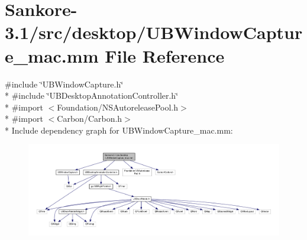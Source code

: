 \hypertarget{_u_b_window_capture__mac_8mm}{\section{Sankore-\/3.1/src/desktop/\-U\-B\-Window\-Capture\-\_\-mac.mm File Reference}
\label{d2/d94/_u_b_window_capture__mac_8mm}
}
{\ttfamily \#include \char`\"{}U\-B\-Window\-Capture.\-h\char`\"{}}\\*
{\ttfamily \#include \char`\"{}U\-B\-Desktop\-Annotation\-Controller.\-h\char`\"{}}\\*
{\ttfamily \#import $<$Foundation/\-N\-S\-Autorelease\-Pool.\-h$>$}\\*
{\ttfamily \#import $<$Carbon/\-Carbon.\-h$>$}\\*
Include dependency graph for U\-B\-Window\-Capture\-\_\-mac.\-mm\-:
\nopagebreak
\begin{figure}[H]
\begin{center}
\leavevmode
\includegraphics[width=350pt]{d5/da7/_u_b_window_capture__mac_8mm__incl}
\end{center}
\end{figure}

